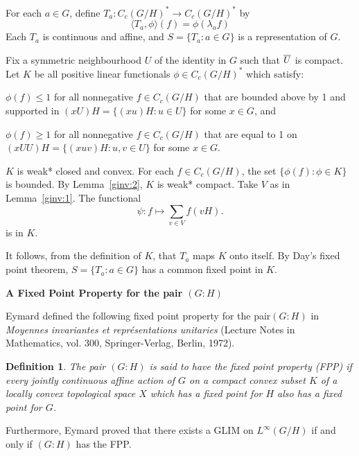 \documentclass[landscape]{slides}
\newtheorem{defn}{Definition}
\begin{document}
\begin{slide}
\proof
For each $a \in G$, define $T_a: C_c(G/H)^*\to C_c(G/H)^*$ by
\[
\langle T_a,\phi\rangle(f) = \phi(\lambda_a f)
\]
Each $T_a$ is continuous and affine, and $S = \{T_a : a\in G \}$ is a 
representation of $G$.

Fix a symmetric neighbourhood $U$ of the identity in $G$ such that $\overline{U}$ is compact.
Let $K$ be all positive linear functionals $\phi \in C_c(G/H)^*$ which satisfy:
\begin{list}{}{\itemsep -6pt \topsep -5pt}
\item $\phi(f) \leq 1$ for all nonnegative $f \in C_c(G/H)$ that are 
bounded 
above by 1 and supported in $(xU)H = \{(xu)H: u\in U\}$ for some $x \in G$, and
\item $\phi(f) \geq 1$ for all nonnegative $f \in C_c(G/H)$ that are equal 
to 1 on $(xUU)H = \{(xuv)H: u,v\in U\}$ for some $x \in G$.
\end{list}
\end{slide}

\begin{slide}
$K$ is weak* closed and convex.  For each $f \in C_c(G/H)$, the set 
$\{\phi(f):\phi\in K\}$ is bounded.  By Lemma~\ref{ginv:2}, $K$ 
is weak* compact.
Take $V$ as in Lemma~\ref{ginv:1}.
The functional
\[
\psi : f \mapsto \sum_{v\in V} f(vH).
\]
is in $K$.

It follows, from the definition of $K$, that $T_a$ maps $K$ onto itself.
By Day's fixed point theorem, $S = \{T_a: a\in G\}$ has a common 
fixed point in $K$.
\done
\end{slide}

\begin{slide}
{\bf A Fixed Point Property for the pair $(G:H)$}

Eymard defined the following fixed point property for the pair\linebreak$(G:H)$ in
\emph{Moyennes invariantes et repr\'{e}sentations unitaries}
(Lecture Notes in Mathematics, vol. 300, Springer-Verlag, Berlin, 1972).\\
\begin{defn}\label{fpp}
The pair $(G:H)$ is said to have the {\it fixed point property} (FPP) if every jointly continuous
affine action of $G$ on a compact convex subset $K$ of a locally convex
topological space $X$ which has a fixed point for $H$ also has a fixed point for $G$.
\end{defn}
Furthermore, Eymard proved that there exists a GLIM on $L^\infty(G/H)$ if and only if $(G:H)$
has the FPP.
\end{slide}
\end{document}
